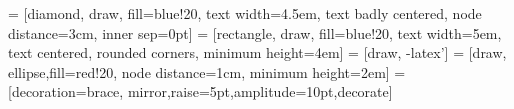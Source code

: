 \documentclass{article}
\begin{document}
\pagestyle{empty}


 = [diamond, draw, fill=blue!20, 
    text width=4.5em, text badly centered, node distance=3cm, inner sep=0pt]
 = [rectangle, draw, fill=blue!20, 
    text width=5em, text centered, rounded corners, minimum height=4em]
 = [draw, -latex']
 = [draw, ellipse,fill=red!20, node distance=1cm,
    minimum height=2em]
 = [decoration={brace, mirror,raise=5pt,amplitude=10pt},decorate]
    
\end{document}
